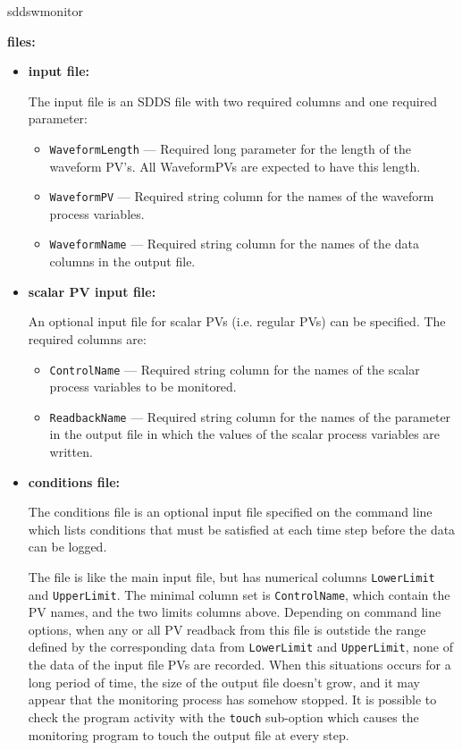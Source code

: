 \begin{sddsprog}{sddswmonitor}
\item {\bf files:}
\begin{itemize}
\item {\bf input file:}\par
The input file is an SDDS file with two required columns and one required parameter:
\begin{itemize}
        \item {\verb+WaveformLength+} --- Required long parameter for the length of the waveform PV's. All
                WaveformPVs are expected to have this length. 
        \item {\verb+WaveformPV+}  --- Required string column for the names of the waveform process variables.
        \item {\verb+WaveformName+} --- Required string column for the names of the data columns in the output file.
\end{itemize}

\item {\bf scalar PV input file:}\par
An optional input file for scalar PVs (i.e. regular PVs) can be specified. The required columns are:
\begin{itemize}
        \item {\tt ControlName} --- Required string column for the names of the scalar process variables
                to be monitored.
        \item {\tt ReadbackName} --- Required string column for the names of the parameter in the 
                output file in which the values of the scalar process variables are written.
\end{itemize}

\item {\bf conditions file:} \par
The conditions file is an optional input file specified on the command line which lists
conditions that must be satisfied at each time step before the data can be logged.

The file is like the main input file, but has numerical columns \verb+LowerLimit+ and \verb+UpperLimit+.
The minimal column set is \verb+ControlName+, which contain the PV names, and the two limits columns above.
Depending on command line options, when any or all PV readback from this file
is outstide the range defined by the corresponding data from \verb+LowerLimit+ and \verb+UpperLimit+,
none of the data of the input file PVs are recorded. 
When this situations occurs for a long period of time, the size of the output file doesn't
grow, and it may appear that the monitoring process has somehow stopped.
It is possible to check the program activity with the \verb+touch+ sub-option
which causes the monitoring program to touch the output file at every step.


\end{itemize}
\end{sddsprog}
